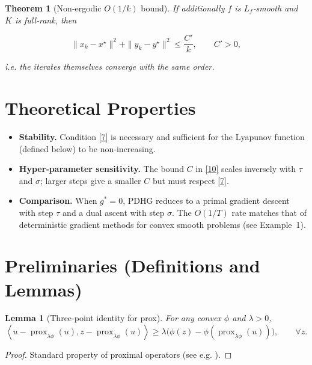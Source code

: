 \documentclass{article}
\newtheorem{theorem}{Theorem}
\newtheorem{lemma}{Lemma}
\newcommand{\inner}[2]{\left\langle #1,#2\right\rangle}
\begin{document}
\begin{theorem}[Non‑ergodic $O(1/k)$ bound]\label{thm:nonerg}
If additionally $f$ is $L_{f}$‑smooth and $K$ is full‑rank, then  

\[
\|x_{k}-x^{\star}\|^{2}+\|y_{k}-y^{\star}\|^{2}\le\frac{C'}{k},
\qquad C'>0,
\tag{11}
\]

i.e. the iterates themselves converge with the same order.
\end{theorem}

\section*{Theoretical Properties}
\begin{itemize}
\item \textbf{Stability.} Condition \eqref{7} is necessary and sufficient for the
Lyapunov function (defined below) to be non‑increasing.
\item \textbf{Hyper‑parameter sensitivity.}
The bound $C$ in \eqref{10} scales inversely with $\tau$ and $\sigma$;
larger steps give a smaller $C$ but must respect \eqref{7}.
\item \textbf{Comparison.}
When $g^{*}=0$, PDHG reduces to a primal gradient descent with step
$\tau$ and a dual ascent with step $\sigma$. The $O(1/T)$ rate matches that of
deterministic gradient methods for convex smooth problems (see Example 1).
\end{itemize}

\section*{Preliminaries (Definitions and Lemmas)}
\begin{lemma}[Three‑point identity for prox]\label{lem:prox}
For any convex $\phi$ and $\lambda>0$,
\[
\inner{u-\operatorname{prox}_{\lambda\phi}(u)}{z-\operatorname{prox}_{\lambda\phi}(u)}
\ge \lambda\bigl(\phi(z)-\phi(\operatorname{prox}_{\lambda\phi}(u))\bigr),
\qquad\forall z.
\tag{12}
\]
\end{lemma}
\begin{proof}
Standard property of proximal operators (see e.g. \cite{parikh2014prox}).
\end{proof}
\end{document}
